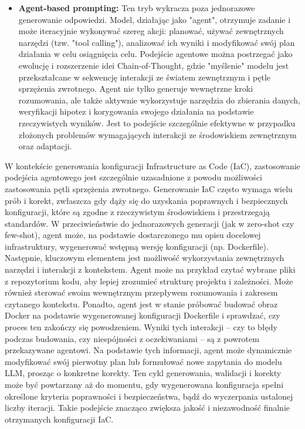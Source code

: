 \begin{itemize}
	\item \textbf{Agent-based prompting:} Ten tryb wykracza poza jednorazowe generowanie odpowiedzi. Model, działając jako "agent", otrzymuje zadanie i może iteracyjnie wykonywać szereg akcji: planować, używać zewnętrznych narzędzi (tzw. "tool calling"), analizować ich wyniki i modyfikować swój plan działania w celu osiągnięcia celu. Podejście agentowe można postrzegać jako ewolucję i rozszerzenie idei Chain-of-Thought, gdzie "myślenie" modelu jest przekształcane w sekwencję interakcji ze światem zewnętrznym i pętle sprzężenia zwrotnego. Agent nie tylko generuje wewnętrzne kroki rozumowania, ale także aktywnie wykorzystuje narzędzia do zbierania danych, weryfikacji hipotez i korygowania swojego działania na podstawie rzeczywistych wyników. Jest to podejście szczególnie efektywne w przypadku złożonych problemów wymagających interakcji ze środowiskiem zewnętrznym oraz adaptacji.
\end{itemize}

W kontekście generowania konfiguracji Infrastructure as Code (IaC), zastosowanie podejścia agentowego jest szczególnie uzasadnione z powodu możliwości zastosowania pętli sprzężenia zwrotnego. Generowanie IaC często wymaga wielu prób i korekt, zwłaszcza gdy dąży się do uzyskania poprawnych i bezpiecznych konfiguracji, które są zgodne z rzeczywistym środowiskiem i przestrzegają standardów. W przeciwieństwie do jednorazowych generacji (jak w zero-shot czy few-shot), agent może, na podstawie dostarczonego mu opisu docelowej infrastruktury, wygenerować wstępną wersję konfiguracji (np. Dockerfile). Następnie, kluczowym elementem jest możliwość wykorzystania zewnętrznych narzędzi i interakcji z kontekstem. Agent może na przykład czytać wybrane pliki z repozytorium kodu, aby lepiej zrozumieć strukturę projektu i zależności. Może również sterować swoim wewnętrznym przepływem rozumowania i zakresem czytanego kontekstu. Ponadto, agent jest w stanie próbować budować obraz Docker na podstawie wygenerowanej konfiguracji Dockerfile i sprawdzać, czy proces ten zakończy się powodzeniem. Wyniki tych interakcji – czy to błędy podczas budowania, czy niespójności z oczekiwaniami – są z powrotem przekazywane agentowi. Na podstawie tych informacji, agent może dynamicznie modyfikować swój pierwotny plan lub formułować nowe zapytania do modelu LLM, prosząc o konkretne korekty. Ten cykl generowania, walidacji i korekty może być powtarzany aż do momentu, gdy wygenerowana konfiguracja spełni określone kryteria poprawności i bezpieczeństwa, bądź do wyczerpania ustalonej liczby iteracji. Takie podejście znacząco zwiększa jakość i niezawodność finalnie otrzymanych konfiguracji IaC.

